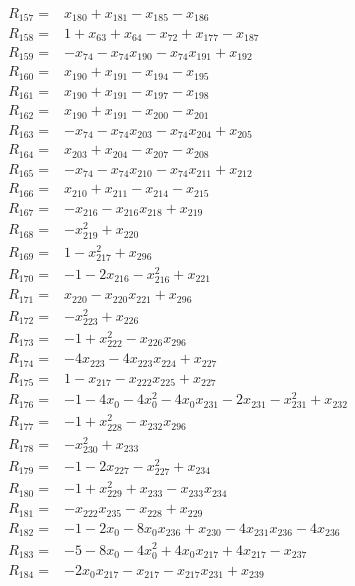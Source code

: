 \begin{align*}
R_{157}={}&x_{180}+x_{181}-x_{185}-x_{186}\\[3pt]
R_{158}={}&1+x_{63}+x_{64}-x_{72}+x_{177}-x_{187}\\[3pt]
R_{159}={}&-x_{74}-x_{74}x_{190}-x_{74}x_{191}+x_{192}\\[3pt]
R_{160}={}&x_{190}+x_{191}-x_{194}-x_{195}\\[3pt]
R_{161}={}&x_{190}+x_{191}-x_{197}-x_{198}\\[3pt]
R_{162}={}&x_{190}+x_{191}-x_{200}-x_{201}\\[3pt]
R_{163}={}&-x_{74}-x_{74}x_{203}-x_{74}x_{204}+x_{205}\\[3pt]
R_{164}={}&x_{203}+x_{204}-x_{207}-x_{208}\\[3pt]
R_{165}={}&-x_{74}-x_{74}x_{210}-x_{74}x_{211}+x_{212}\\[3pt]
R_{166}={}&x_{210}+x_{211}-x_{214}-x_{215}\\[3pt]
R_{167}={}&-x_{216}-x_{216}x_{218}+x_{219}\\[3pt]
R_{168}={}&-x_{219}^{2}+x_{220}\\[3pt]
R_{169}={}&1-x_{217}^{2}+x_{296}\\[3pt]
R_{170}={}&-1-2x_{216}-x_{216}^{2}+x_{221}\\[3pt]
R_{171}={}&x_{220}-x_{220}x_{221}+x_{296}\\[3pt]
R_{172}={}&-x_{223}^{2}+x_{226}\\[3pt]
R_{173}={}&-1+x_{222}^{2}-x_{226}x_{296}\\[3pt]
R_{174}={}&-4x_{223}-4x_{223}x_{224}+x_{227}\\[3pt]
R_{175}={}&1-x_{217}-x_{222}x_{225}+x_{227}\\[3pt]
R_{176}={}&-1-4x_{0}-4x_{0}^{2}-4x_{0}x_{231}-2x_{231}-x_{231}^{2}+x_{232}\\[3pt]
R_{177}={}&-1+x_{228}^{2}-x_{232}x_{296}\\[3pt]
R_{178}={}&-x_{230}^{2}+x_{233}\\[3pt]
R_{179}={}&-1-2x_{227}-x_{227}^{2}+x_{234}\\[3pt]
R_{180}={}&-1+x_{229}^{2}+x_{233}-x_{233}x_{234}\\[3pt]
R_{181}={}&-x_{222}x_{235}-x_{228}+x_{229}\\[3pt]
R_{182}={}&-1-2x_{0}-8x_{0}x_{236}+x_{230}-4x_{231}x_{236}-4x_{236}\\[3pt]
R_{183}={}&-5-8x_{0}-4x_{0}^{2}+4x_{0}x_{217}+4x_{217}-x_{237}\\[3pt]
R_{184}={}&-2x_{0}x_{217}-x_{217}-x_{217}x_{231}+x_{239}\\[3pt]

\end{align*}

